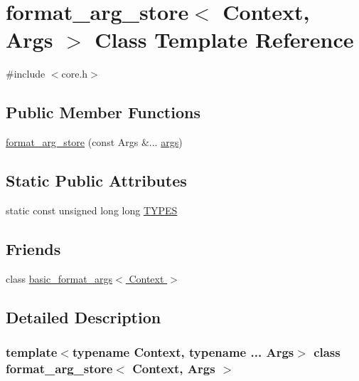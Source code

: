 \hypertarget{classformat__arg__store}{}\section{format\+\_\+arg\+\_\+store$<$ Context, Args $>$ Class Template Reference}
\label{classformat__arg__store}


{\ttfamily \#include $<$core.\+h$>$}

\subsection*{Public Member Functions}
\begin{DoxyCompactItemize}
\item 
\hyperlink{classformat__arg__store_a785430d11d4e8e5dcd9f231e7d69695e}{format\+\_\+arg\+\_\+store} (const Args \&... \hyperlink{printf_8h_a47047b7b28fd1342eef756b79c778580}{args})
\end{DoxyCompactItemize}
\subsection*{Static Public Attributes}
\begin{DoxyCompactItemize}
\item 
static const unsigned long long \hyperlink{classformat__arg__store_a36570336ba52d8ae52c67b0492d4463c}{T\+Y\+P\+ES}
\end{DoxyCompactItemize}
\subsection*{Friends}
\begin{DoxyCompactItemize}
\item 
class \hyperlink{classformat__arg__store_ab8e9e33cc7b78829001a86ef6110ebb6}{basic\+\_\+format\+\_\+args$<$ Context $>$}
\end{DoxyCompactItemize}


\subsection{Detailed Description}
\subsubsection*{template$<$typename Context, typename ... Args$>$\newline
class format\+\_\+arg\+\_\+store$<$ Context, Args $>$}

